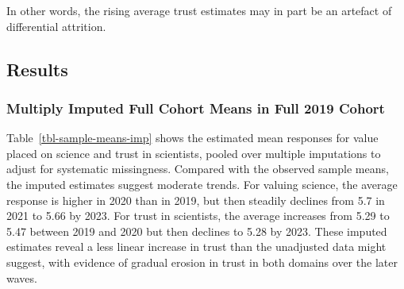 \documentclass[
  single column]{article}
\begin{document}
In other words, the rising average trust estimates may in part be an
artefact of differential attrition.

\newpage{}

\subsection{Results}\label{results}

\subsubsection{Multiply Imputed Full Cohort Means in Full 2019
Cohort}\label{multiply-imputed-full-cohort-means-in-full-2019-cohort}

Table~\ref{tbl-sample-means-imp} shows the estimated mean responses for
value placed on science and trust in scientists, pooled over multiple
imputations to adjust for systematic missingness. Compared with the
observed sample means, the imputed estimates suggest moderate trends.
For valuing science, the average response is higher in 2020 than in
2019, but then steadily declines from 5.7 in 2021 to 5.66 by 2023. For
trust in scientists, the average increases from 5.29 to 5.47 between
2019 and 2020 but then declines to 5.28 by 2023. These imputed estimates
reveal a less linear increase in trust than the unadjusted data might
suggest, with evidence of gradual erosion in trust in both domains over
the later waves.
\end{document}
